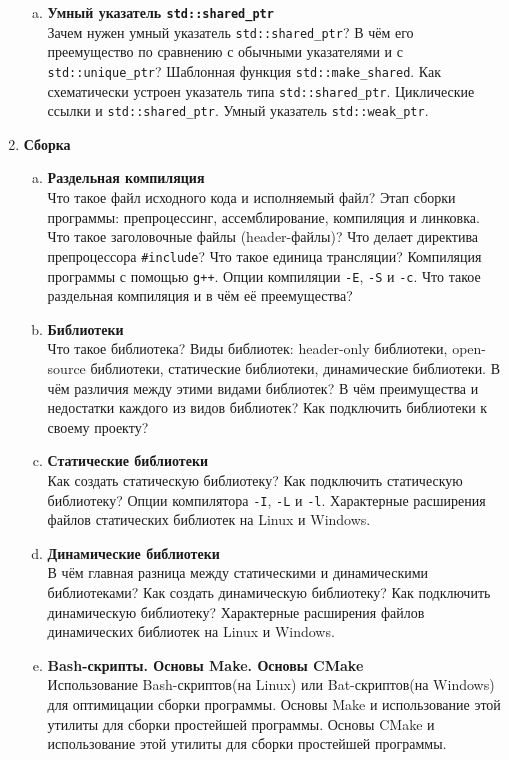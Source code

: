 \documentclass{article}
\begin{document}
\begin{enumerate}
\begin{enumerate}[a.]
\item \textbf{Умный указатель \texttt{std::shared\_ptr}}\\
Зачем нужен умный указатель \texttt{std::shared\_ptr}? В чём его преемущество по сравнению с обычными указателями и с \texttt{std::unique\_ptr}? Шаблонная функция \texttt{std::make\_shared}. Как схематически устроен указатель типа \texttt{std::shared\_ptr}. Циклические ссылки и \texttt{std::shared\_ptr}. Умный указатель \texttt{std::weak\_ptr}.

\end{enumerate}

\item \textbf{Сборка}
\begin{enumerate}[a.]
\item \textbf{Раздельная компиляция}\\
Что такое файл исходного кода и исполняемый файл? Этап сборки программы: препроцессинг, ассемблирование, компиляция и линковка. Что такое заголовочные файлы (header-файлы)? Что делает директива препроцессора \texttt{\#include}? Что такое единица трансляции? Компиляция программы с помощью \texttt{g++}. Опции компиляции \texttt{-E}, \texttt{-S} и \texttt{-c}. Что такое раздельная компиляция и в чём её преемущества?


\item \textbf{Библиотеки}\\
Что такое библиотека? Виды библиотек: header-only библиотеки, open-source библиотеки, статические библиотеки, динамические библиотеки. В чём различия между этими видами библиотек? В чём преимущества и недостатки каждого из видов библиотек? Как подключить библиотеки к своему проекту? 

\item \textbf{Статические библиотеки}\\
Как создать статическую библиотеку? Как подключить статическую библиотеку? Опции компилятора \texttt{-I}, \texttt{-L} и \texttt{-l}. Характерные расширения файлов статических библиотек на Linux и Windows. 

\item \textbf{Динамические библиотеки}\\
В чём главная разница между статическими и динамическими библиотеками? Как создать динамическую библиотеку? Как подключить динамическую библиотеку? Характерные расширения файлов динамических библиотек на Linux и Windows. 

\item \textbf{Bash-скрипты. Основы Make. Основы CMake}\\
Использование Bash-скриптов(на Linux) или Bat-скриптов(на Windows) для оптимицации сборки программы. Основы Make и использование этой утилиты для сборки простейшей программы. Основы CMake и использование этой утилиты для сборки простейшей программы.
\end{enumerate}



\end{enumerate}
\end{document}
